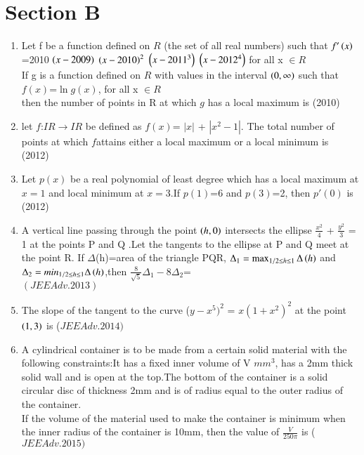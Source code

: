 \documentclass[journal,12pt,twocolumn]{IEEEtran}
\theoremstyle{remark}
\begin{document}
																				 \section{Section B}
																				 \begin{enumerate}
																				 \item Let f be a function defined on $R$ (the set of all real numbers) such that $f'\left(x\right)$=2010 $\left(x-2009\right)$ $\left(x-2010\right)^2$ $\left(x-2011^3\right)$ $\left(x-2012^4\right)$ for all x $\in R$ \\ If g is a function defined on $R$ with values in the interval $\left(0,\infty\right)$ such that \\
																				   $f(x)$=$\ln{g(x)}$, for all x $\in R$\\ then the number of points in R at which $g$ has a local maximum is \hfill (2010)\\
																				   \item let $f$:$IR \rightarrow IR$ be defined as $f(x)$= $|x|$ + $|x^2-1|$. The total number of points at which $f$attains either a local maximum or a local minimum is\\ \hfill (2012) \\
																				   \item Let $p(x)$ be a real polynomial of least degree which has a local maximum at $x=1$ and local minimum at $x=3$.If $p(1)$=6 and $p(3)$=2, then $p'(0)$ is \hfill (2012) \\
																				   \item A vertical line passing through the point $\left(h,0\right)$ intersects the ellipse $\frac{x^2}{4}$ + $\frac{y^2}{3}$ = 1 at the points P and Q .Let the tangents to the ellipse at P and Q meet at the point R. If $\Delta$(h)=area of the triangle PQR, $\Delta_1  = \max _{1/2\leq h \leq 1}\Delta\left(h\right)$ and $\Delta_2 = min_{1/2\leq h \leq 1}\Delta\left(h\right)$,then $\frac{8}{\sqrt{5}}\Delta_1 - 8\Delta_2$=\\\hfill $(JEEAdv.2013)$\\
																				   \item The slope of the tangent to the curve ($y-x^5)^2$ = $x(1+x^2)^2$ at the point $\left(1,3\right)$ is \hfill ($JEE Adv. 2014)$ \\
																				   \item A cylindrical container is to be made from a certain solid material with the following constraints:It has a fixed inner volume of V $mm^3$, has a 2mm thick solid wall and is open at the top.The bottom of the container is a solid circular disc of thickness 2mm and is of radius equal to the outer radius of the container.\\If the volume of the material used to make the container is minimum when the inner radius of the container is 10mm, then the value of $\frac{V}{250\pi}$ is \hfill ($JEE Adv. 2015)$ \\  
																				   \end{enumerate}
																				   
\end{document}
